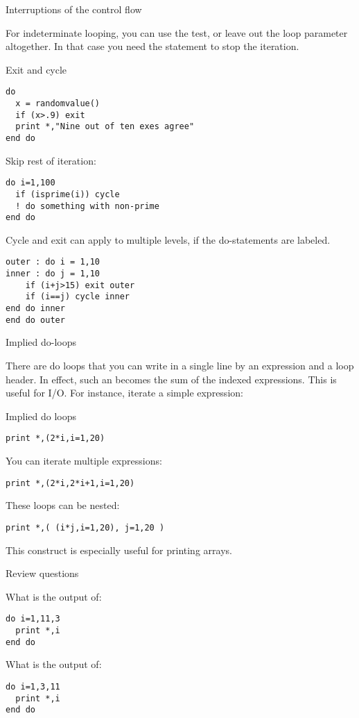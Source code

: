  {Interruptions of the control flow}

For indeterminate looping, you can use the  test,
or leave out the loop parameter altogether.
In that case you need the  statement to stop the iteration.

\begin{block}{Exit and cycle}
  \label{sl:loopexit}
\begin{verbatim}
do
  x = randomvalue()
  if (x>.9) exit
  print *,"Nine out of ten exes agree"
end do
\end{verbatim}

Skip rest of iteration:
\begin{verbatim}
do i=1,100
  if (isprime(i)) cycle
  ! do something with non-prime
end do
\end{verbatim}
\end{block}

Cycle and exit can apply to multiple levels, if the do-statements are
labeled.

\begin{verbatim}
outer : do i = 1,10
inner : do j = 1,10
    if (i+j>15) exit outer
    if (i==j) cycle inner
end do inner
end do outer
\end{verbatim}

 {Implied do-loops}
\label{sec:f-impdo}

There are do loops that you can write in a single line by an
expression and a loop header. In effect, such an
 becomes the sum of the indexed
expressions. This is useful
for I/O. For instance, iterate a simple expression:

\begin{block}{Implied do loops}
  \label{sl:implieddo}
\begin{verbatim}
print *,(2*i,i=1,20)
\end{verbatim}
You can iterate multiple expressions:
\begin{verbatim}
print *,(2*i,2*i+1,i=1,20)
\end{verbatim}
These loops can be nested:
\begin{verbatim}
print *,( (i*j,i=1,20), j=1,20 )
\end{verbatim}
\end{block}

This construct is especially useful for printing arrays.

 {Review questions}

\begin{exercise}
  \label{ex:floop-inf}
  What is the output of:
\begin{verbatim}
do i=1,11,3
  print *,i
end do
\end{verbatim}
What is the output of:
\begin{verbatim}
do i=1,3,11
  print *,i
end do
\end{verbatim}
\end{exercise}
